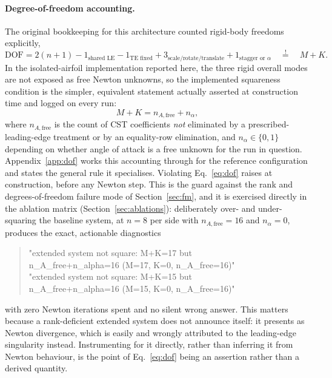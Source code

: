 \paragraph{Degree-of-freedom accounting.} The original bookkeeping for this
architecture counted rigid-body freedoms explicitly,
\[
  \mathrm{DOF} = 2(n+1) - 1_{\text{shared LE}} - 1_{\text{TE fixed}}
  + 3_{\text{scale/rotate/translate}} + 1_{\text{stagger or }\alpha}
  \quad\stackrel{!}{=}\quad M + K .
\]
In the isolated-airfoil implementation reported here, the three rigid overall
modes are not exposed as free Newton unknowns, so the implemented squareness
condition is the simpler, equivalent statement actually asserted at
construction time and logged on every run:
\begin{equation}
  M + K = n_{A,\text{free}} + n_{\alpha},
  \label{eq:dof}
\end{equation}
where $n_{A,\text{free}}$ is the count of CST coefficients \emph{not}
eliminated by a prescribed-leading-edge treatment or by an equality-row
elimination, and $n_\alpha\in\{0,1\}$ depending on whether angle of attack is
a free unknown for the run in question. Appendix~\ref{app:dof} works this
accounting through for the reference configuration and states the general rule
it specialises. Violating Eq.~\eqref{eq:dof} raises at construction, before
any Newton step. This is the guard against the rank and degrees-of-freedom
failure mode of Section~\ref{sec:fm}, and it is exercised directly in the
ablation matrix (Section~\ref{sec:ablations}): deliberately over- and
under-squaring the baseline system, at $n=8$ per side with
$n_{A,\text{free}}=16$ and $n_\alpha=0$, produces the exact, actionable
diagnostics
\begin{quote}\footnotesize\ttfamily
"extended system not square: M+K=17 but\\
\hspace*{1em}n\_A\_free+n\_alpha=16 (M=17, K=0, n\_A\_free=16)"\\[2pt]
"extended system not square: M+K=15 but\\
\hspace*{1em}n\_A\_free+n\_alpha=16 (M=15, K=0, n\_A\_free=16)"
\end{quote}
with zero Newton iterations spent and no silent wrong answer. This matters
because a rank-deficient extended system does not announce itself: it presents
as Newton divergence, which is easily and wrongly attributed to the
leading-edge singularity instead. Instrumenting for it directly, rather than
inferring it from Newton behaviour, is the point of Eq.~\eqref{eq:dof} being
an assertion rather than a derived quantity.

